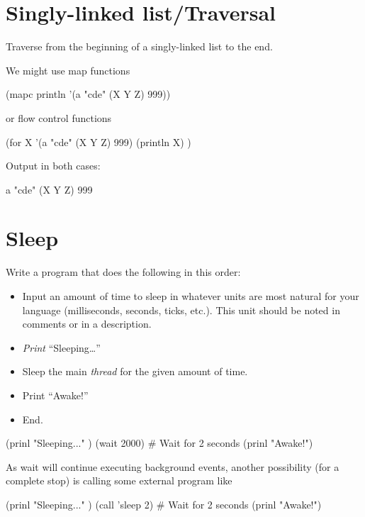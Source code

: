 \pagebreak{}
\section*{Singly-linked list/Traversal}

Traverse from the beginning of a singly-linked list to the end.

\begin{wideverbatim}

We might use map functions

(mapc println '(a "cde" (X Y Z) 999))

or flow control functions

(for X '(a "cde" (X Y Z) 999)
   (println X) )

Output in both cases:

a
"cde"
(X Y Z)
999

\end{wideverbatim}

\pagebreak{}
\section*{Sleep}

Write a program that does the following in this order:

\begin{itemize}
\item
  Input an amount of time to sleep in whatever units are most natural
  for your language (milliseconds, seconds, ticks, etc.). This unit
  should be noted in comments or in a description.
\item
  \emph{Print} ``Sleeping\ldots{}''
\item
  Sleep the main \emph{thread} for the given amount of
  time.
\item
  Print ``Awake!''
\item
  End.
\end{itemize}

\begin{wideverbatim}

(prinl "Sleeping..." )
(wait 2000)                # Wait for 2 seconds
(prinl "Awake!")

As wait will continue executing background events, another possibility (for a
complete stop) is calling some external program like

(prinl "Sleeping..." )
(call 'sleep 2)            # Wait for 2 seconds
(prinl "Awake!")

\end{wideverbatim}

